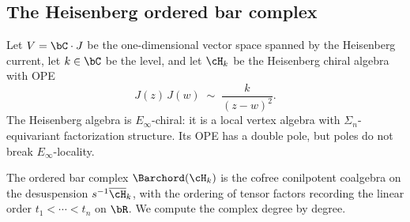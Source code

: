 \subsection{The Heisenberg ordered bar complex}
\label{subsec:heisenberg-ordered-bar}

Let $V = \bC\cdot J$ be the one-dimensional vector space spanned by
the Heisenberg current, let $k\in\bC$ be the level, and let $\cH_k$
be the Heisenberg chiral algebra with OPE
\begin{equation}\label{eq:heisenberg-ope-ordered}
J(z)\,J(w) \;\sim\; \frac{k}{(z-w)^2}.
\end{equation}
The Heisenberg algebra is $E_\infty$-chiral: it is a local vertex
algebra with $\Sigma_n$-equivariant factorization structure. Its OPE
has a double pole, but poles do not break $E_\infty$-locality.

The ordered bar complex $\Barchord(\cH_k)$ is the cofree conilpotent
coalgebra on the desuspension $\susp^{-1}\overline{\cH}_k$, with
the ordering of tensor factors recording the linear order
$t_1 < \cdots < t_n$ on $\bR$. We compute the complex degree by
degree.

